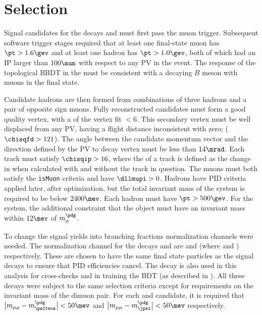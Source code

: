 \section{Selection}

Signal candidates for the decays \btokpipimumu and \btophikmumu must first pass the \lone muon
trigger.
Subsequent software trigger stages required that at least one final-state muon has $\pt>1.6\gev$
and at least one hadron has $\pt>1.0\gev$, both of which had an IP larger than $100\mum$ with
respect to any PV in the event.
The response of the topological BBDT in the \hlttwo must be consistent with a decaying $B$ meson
with muons in the final state.


Candidate \Bp hadrons are then formed from combinations of three hadrons and a pair of opposite
sign muons.
Fully reconstructed candidates must form a good quality vertex, with a \chisq of the vertex fit
$<6$.
This secondary vertex must be well displaced from any PV, having a flight distance inconsistent
with zero; ($\chisqfd>121$).
The angle between the \Bp candidate momentum vector and the direction defined by the PV to \Bp decay
vertex must be less than $14\mrad$.
Each track must satisfy $\chisqip>16$, where the \chisqip of a track is defined as the change in
\chisqip when calculated with and without the track in question.
The muons must both satisfy the {\tt isMuon} criteria and have $\dllmupi>0$.
Hadrons have PID criteria applied later, after optimization, but the total invariant mass of the
\kpipi system is required to be below $2400\mev$.
Each hadron must have $\pt>500\gev$.
For the \phik system, the additional constraint that the \decay{\phi}{\kk} object must have an
invariant mass within $12\mev$ of $m_\phi^\pdg$.

To change the signal yields into branching fractions normalization channels were needed.
The normalization channel for the decays \btokpipimumu and \btophikmumu are \btopsitwosk and
\btojpsiphik (where \psitwostojpsipipi and \jpsitomumu) respectively.
These are chosen to have the same final state particles as the signal decays to ensure that PID
efficiencies cancel.
The decay \btojpsikpipi is also used in this analysis for cross-checks and in training the BDT (as
described in ).
All these decays were subject to the same selection criteria except for requirements on the
invariant mass of the dimuon pair.
For each \psitwos and \jpsi candidate, it is required that
$\big|m_{\mu\mu}-m_{\psitwos}^\pdg\big|<50\mev$ and
$\big|m_{\mu\mu}-m_\jpsi^\pdg\big|<50\mev$ respectively.


